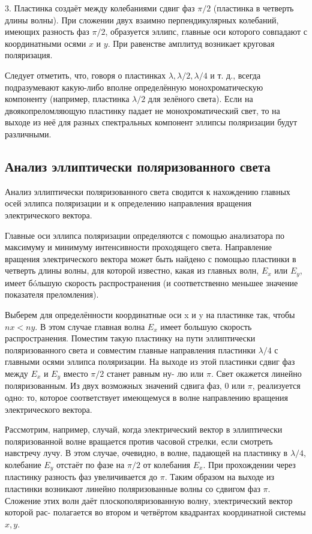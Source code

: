 3.  Пластинка создаёт между колебаниями сдвиг фаз $ \pi/2 $ (пластинка
в четверть длины волны). При сложении двух взаимно перпендикулярных колебаний, имеющих разность фаз $ \pi/2 $, образуется эллипс, главные оси которого совпадают с координатными осями $ x $ и $ y $. При равенстве амплитуд возникает круговая поляризация.
 	


Следует отметить, что, говоря о пластинках $ \lambda , \lambda/2, \lambda/4  $ и т. д., всегда подразумевают какую-либо вполне определённую монохроматическую
компоненту (например, пластинка $ \lambda/2 $ для зелёного света). Если на двоякопреломляющую пластинку падает не монохроматический свет, то на
выходе из неё для разных спектральных компонент эллипсы поляризации будут различными.

\subsection{Анализ эллиптически поляризованного света}

Анализ эллиптически поляризованного света сводится к нахождению главных осей
эллипса поляризации и к определению направления вращения электрического вектора.

Главные оси эллипса поляризации определяются с помощью анализатора по максимуму и минимуму интенсивности проходящего света.
Направление вращения электрического вектора может быть найдено
с помощью пластинки в четверть длины волны, для которой известно,
какая из главных волн, $ E_x $ или $ E_y $, имеет б\'{o}льшую скорость распространения (и соответственно меньшее значение показателя преломления).

Выберем для определённости координатные оси x и y на пластинке
так, чтобы $ nx < ny $. В этом случае главная волна $ E_x $ имеет большую
скорость распространения. Поместим такую пластинку на пути эллиптически поляризованного света и совместим главные направления пластинки $ \lambda/4 $ с главными осями эллипса поляризации. На выходе из этой
пластинки сдвиг фаз между $ E_x $ и $ E_y $ вместо $ \pi/2 $ станет равным ну-
лю или $ \pi $. Свет окажется линейно поляризованным. Из двух возможных значений сдвига фаз, 0 или $ \pi $, реализуется одно: то, которое соответствует имеющемуся в волне направлению вращения электрического вектора.

Рассмотрим, например, случай, когда электрический вектор в эллиптически поляризованной волне вращается против часовой стрелки,
если смотреть навстречу лучу. В этом случае, очевидно, в волне, падающей на пластинку в $ \lambda/4 $, колебание $ E_y $ отстаёт по фазе на $ \pi/2 $ от
колебания $ E_x $. При прохождении через пластинку разность фаз увеличивается до $ \pi $. Таким образом на выходе из пластинки возникают линейно поляризованные волны со сдвигом фаз $ \pi $. Сложение этих волн
даёт плоскополяризованную волну, электрический вектор которой рас-
полагается во втором и четвёртом квадрантах координатной системы
$ x, y $.

